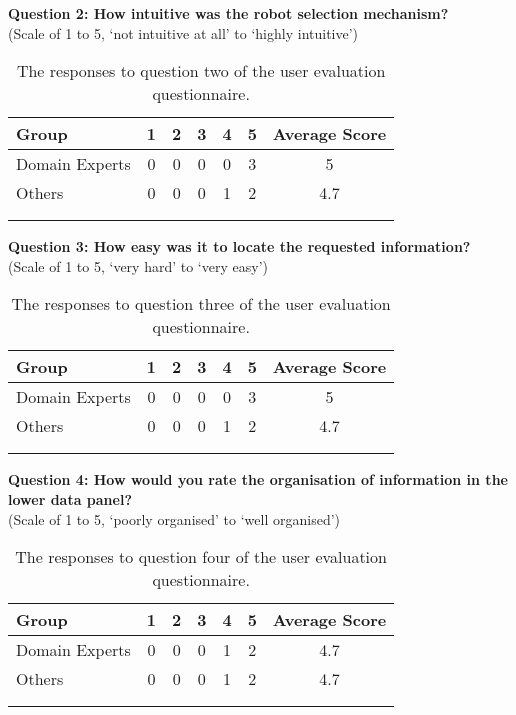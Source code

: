 \noindent\textbf{Question 2: How intuitive was the robot selection mechanism?}\\(Scale of 1 to 5, `not intuitive at all' to `highly intuitive')

\begin{longtable}{ l c c c c c c }
 \textbf{Group} & \textbf{1} & \textbf{2} & \textbf{3} & \textbf{4} & \textbf{5} & \textbf{Average Score} \\ 
 \hline
 Domain Experts & 0 & 0 & 0 & 0 & 3 & 5 \\
 Others 		& 0 & 0 & 0 & 1 & 2 & 4.7 \\
 \bottomrule
\caption[User Evaluation Question 2 Responses]{The responses to question two of the user evaluation questionnaire.}\\
\label{tab:EvaluationQuestionTwo}
\end{longtable}

\noindent\textbf{Question 3: How easy was it to locate the requested information?}\\(Scale of 1 to 5, `very hard' to `very easy')

\begin{longtable}{ l c c c c c c }
 \textbf{Group} & \textbf{1} & \textbf{2} & \textbf{3} & \textbf{4} & \textbf{5} & \textbf{Average Score} \\ 
 \hline
 Domain Experts & 0 & 0 & 0 & 0 & 3 & 5 \\
 Others 		& 0 & 0 & 0 & 1 & 2 & 4.7 \\
 \bottomrule
\caption[User Evaluation Question 3 Responses]{The responses to question three of the user evaluation questionnaire.}\\
\label{tab:EvaluationQuestionThree}
\end{longtable}

\noindent\textbf{Question 4: How would you rate the organisation of information in the lower data panel?}\\(Scale of 1 to 5, `poorly organised' to `well organised')

\begin{longtable}{ l c c c c c c }
 \textbf{Group} & \textbf{1} & \textbf{2} & \textbf{3} & \textbf{4} & \textbf{5} & \textbf{Average Score} \\ 
 \hline
 Domain Experts & 0 & 0 & 0 & 1 & 2 & 4.7 \\
 Others 		& 0 & 0 & 0 & 1 & 2 & 4.7 \\
 \bottomrule
\caption[User Evaluation Question 4 Responses]{The responses to question four of the user evaluation questionnaire.}\\
\label{tab:EvaluationQuestionFour}
\end{longtable}

